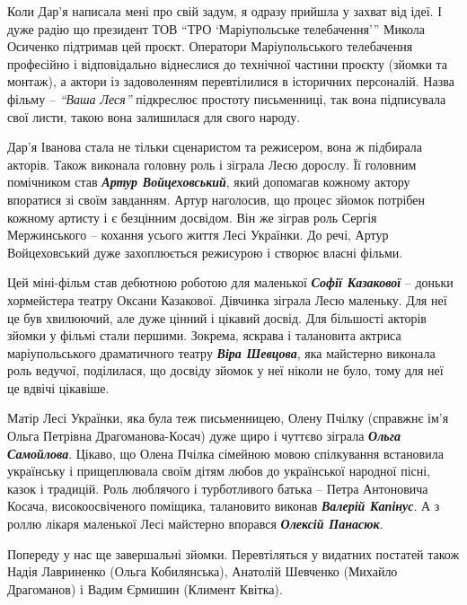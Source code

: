 
Коли Дар'я написала мені про свій задум, я одразу прийшла у захват від ідеї. І
дуже радію що президент ТОВ \enquote{ТРО \enquote{Маріупольське телебачення}} Микола Осиченко
підтримав цей проєкт. Оператори Маріупольського телебачення професійно і
відповідально віднеслися до технічної частини проєкту (зйомки та монтаж), а
актори із задоволенням перевтілилися в історичних персоналій. Назва фільму –
\emph{\enquote{Ваша Леся}} підкреслює простоту письменниці, так вона підписувала свої листи,
такою вона залишилася для свого народу.


Дар'я Іванова стала не тільки сценаристом та режисером, вона ж підбирала
акторів. Також виконала головну роль і зіграла Лесю дорослу. Її головним
помічником став \emph{\textbf{Артур Войцеховський}}, який допомагав кожному актору впоратися зі
своїм завданням. Артур наголосив, що процес зйомок потрібен кожному артисту і є
безцінним досвідом. Він же зіграв роль Сергія Мержинського – кохання усього
життя Лесі Українки. До речі, Артур Войцеховський дуже захоплюється режисурою і
створює власні фільми.

Цей міні-фільм став дебютною роботою для маленької \emph{\textbf{Софії Казакової}} – доньки
хормейстера театру Оксани Казакової. Дівчинка зіграла Лесю маленьку. Для неї це
був хвилюючий, але дуже цінний і цікавий досвід. Для більшості акторів зйомки у
фільмі стали першими. Зокрема, яскрава і талановита актриса маріупольського
драматичного театру \emph{\textbf{Віра Шевцова}}, яка майстерно виконала роль ведучої,
поділилася, що досвіду зйомок у неї ніколи не було, тому для неї це вдвічі
цікавіше.

Матір Лесі Українки, яка була теж письменницею, Олену Пчілку  (справжнє ім'я
Ольга Петрівна Драгоманова-Косач) дуже щиро і чуттєво зіграла \emph{\textbf{Ольга Самойлова}}.
Цікаво, що Олена Пчілка сімейною мовою спілкування встановила українську і
прищеплювала своїм дітям любов до української народної пісні, казок і традицій.
Роль люблячого і турботливого батька – Петра Антоновича Косача,
високоосвіченого поміщика, талановито виконав \emph{\textbf{Валерій Капінус}}. А з роллю лікаря
маленької Лесі майстерно впорався \emph{\textbf{Олексій Панасюк}}.


Попереду у нас ще завершальні зйомки. Перевтіляться у видатних постатей також
Надія Лавриненко (Ольга Кобилянська), Анатолій Шевченко (Михайло Драгоманов) і
Вадим Єрмишин (Климент Квітка).


